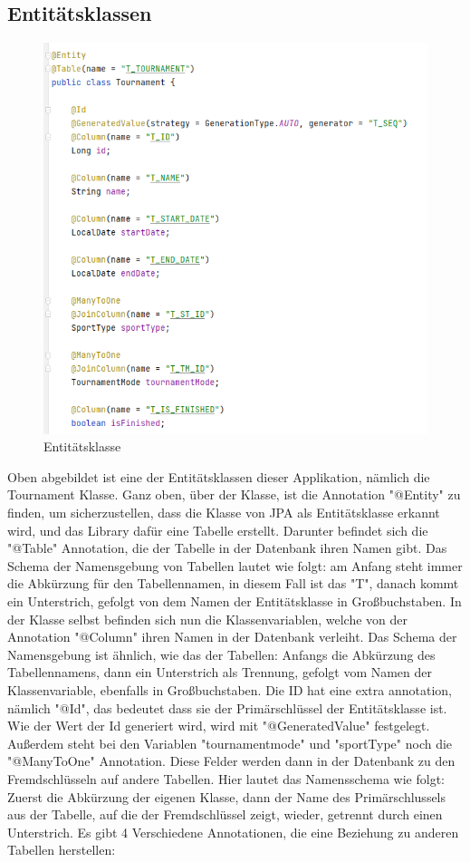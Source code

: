 \subsection{Entitätsklassen}

\begin{figure}[H]
    \includegraphics[scale=0.8]{pics/backend/entity_class.png}
    \caption{Entitätsklasse}
\end{figure}

Oben abgebildet ist eine der Entitätsklassen dieser Applikation, nämlich die Tournament Klasse. Ganz oben, über der Klasse, ist die Annotation "@Entity" zu finden, um sicherzustellen, dass die Klasse von JPA als Entitätsklasse erkannt wird, 
und das Library dafür eine Tabelle erstellt. Darunter befindet sich die "@Table" Annotation, die der Tabelle in der Datenbank ihren Namen gibt. Das Schema der Namensgebung von Tabellen lautet wie folgt: 
am Anfang steht immer die Abkürzung für den Tabellennamen, in diesem Fall ist das "T", danach kommt ein Unterstrich, gefolgt von dem Namen der Entitätsklasse in Großbuchstaben. 
In der Klasse selbst befinden sich nun die Klassenvariablen, welche von der Annotation "@Column" ihren Namen in der Datenbank verleiht. Das Schema der Namensgebung ist ähnlich, wie das der Tabellen: 
Anfangs die Abkürzung des Tabellennamens, dann ein Unterstrich als Trennung, gefolgt vom Namen der Klassenvariable, ebenfalls in Großbuchstaben. Die ID hat eine extra annotation, nämlich "@Id", 
das bedeutet dass sie der Primärschlüssel der Entitätsklasse ist. Wie der Wert der Id generiert wird, wird mit "@GeneratedValue" festgelegt. Außerdem steht bei den Variablen "tournamentmode" und "sportType" noch die "@ManyToOne" Annotation. 
Diese Felder werden dann in der Datenbank zu den Fremdschlüsseln auf andere Tabellen. Hier lautet das Namensschema wie folgt: Zuerst die Abkürzung der eigenen Klasse, 
dann der Name des Primärschlussels aus der Tabelle, auf die der Fremdschlüssel zeigt, wieder, getrennt durch einen Unterstrich.
Es gibt 4 Verschiedene Annotationen, die eine Beziehung zu anderen Tabellen herstellen:

